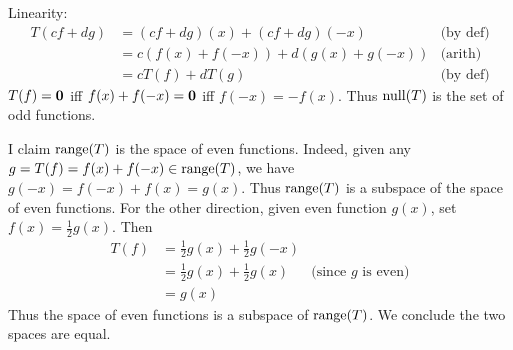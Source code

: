 \begin{solution}
\noindent Linearity:
\begin{align*}
T(cf+dg)&=(cf+dg)(x)+(cf+dg)(-x) &\text{(by def)}\\
&=c(f(x)+f(-x))+d(g(x)+g(-x)) &\text{(arith)}\\
&=cT(f)+dT(g) &\text{(by def)}
\end{align*}
\noindent $T(f)={\mathbf 0}$ iff $f(x)+f(-x)={\mathbf 0}$ iff $f(-x)=-f(x)$. Thus $\operatorname{null}(T)$ is the set of odd functions. 

I claim $\operatorname{range}(T)$ is the space of even functions. Indeed, given any $g=T(f)=f(x)+f(-x)\in\operatorname{range}(T)$, we have $g(-x)=f(-x)+f(x)=g(x)$. Thus $\operatorname{range}(T)$ is a subspace of the space of even functions. For the other direction, given even function $g(x)$, set $f(x)=\frac{1}{2}g(x)$. Then 
\begin{align*}
T(f)&=\frac{1}{2}g(x)+\frac{1}{2}g(-x)\\
&=\frac{1}{2}g(x)+\frac{1}{2}g(x) &\text{(since $g$ is even)}\\
&=g(x)
\end{align*}
Thus the space of even functions is a subspace of $\operatorname{range}(T)$. We conclude the two spaces are equal. 
\end{solution} 

\ee